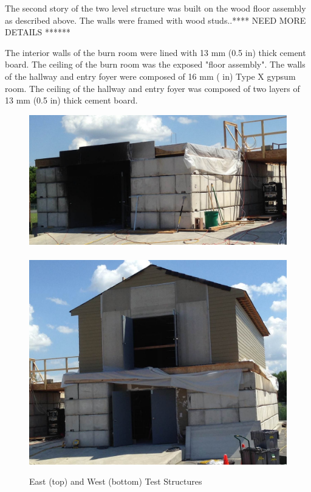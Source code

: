 \documentclass[12pt,oneside]{book}
\begin{document}
The second story of the two level structure was built on the wood floor assembly as described above. The walls were framed with wood studs..**** NEED MORE DETAILS ******

The interior walls of the burn room were lined with 13 mm (0.5 in) thick cement board.  The ceiling of the burn room was the exposed "floor assembly".  The walls of the hallway and entry foyer were composed of 16 mm ( in) Type X gypsum room. The ceiling of the hallway and entry foyer was composed of two layers of 13 mm (0.5 in) thick cement board.  

\begin{figure}[!ht]
\includegraphics[width=6in]{../Pictures/east_structure}
\\~\\
\includegraphics[width=6in]{../Pictures/west_structure}
\caption[East and West Test Structures]{East (top) and West (bottom) Test Structures}
\label{fig:struct_pics}
\end{figure}
\end{document}
